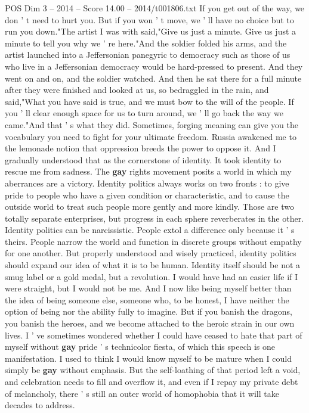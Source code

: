 \begin{textsample}{POS Dim 3 – 2014 – Score 14.00 – 2014/t001806.txt}
If you get out of the way, we don ' t need to hurt you.
But if you won ' t move, we ' ll have no choice but to run you down."The artist I was with said,"Give us just a minute.
Give us just a minute to tell you why we ' re here."And the soldier folded his arms, and the artist launched into a Jeffersonian panegyric to democracy such as those of us who live in a Jeffersonian democracy would be hard-pressed to present.
And they went on and on, and the soldier watched.
And then he sat there for a full minute after they were finished and looked at us, so bedraggled in the rain, and said,"What you have said is true, and we must bow to the will of the people.
If you ' ll clear enough space for us to turn around, we ' ll go back the way we came."And that ' s what they did.
Sometimes, forging meaning can give you the vocabulary you need to fight for your ultimate freedom.
Russia awakened me to the lemonade notion that oppression breeds the power to oppose it.
And I gradually understood that as the cornerstone of identity.
It took identity to rescue me from sadness.
The \textbf{gay} rights movement posits a world in which my aberrances are a victory.
Identity politics always works on two fronts : to give pride to people who have a given condition or characteristic, and to cause the outside world to treat such people more gently and more kindly.
Those are two totally separate enterprises, but progress in each sphere reverberates in the other.
Identity politics can be narcissistic.
People extol a difference only because it ' s theirs.
People narrow the world and function in discrete groups without empathy for one another.
But properly understood and wisely practiced, identity politics should expand our idea of what it is to be human.
Identity itself should be not a smug label or a gold medal, but a revolution.
I would have had an easier life if I were straight, but I would not be me.
And I now like being myself better than the idea of being someone else, someone who, to be honest, I have neither the option of being nor the ability fully to imagine.
But if you banish the dragons, you banish the heroes, and we become attached to the heroic strain in our own lives.
I ' ve sometimes wondered whether I could have ceased to hate that part of myself without \textbf{gay} pride ' s technicolor fiesta, of which this speech is one manifestation.
I used to think I would know myself to be mature when I could simply be \textbf{gay} without emphasis.
But the self-loathing of that period left a void, and celebration needs to fill and overflow it, and even if I repay my private debt of melancholy, there ' s still an outer world of homophobia that it will take decades to address.

\end{textsample}
